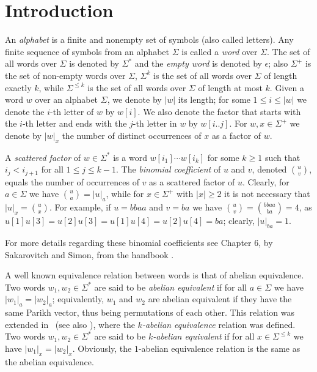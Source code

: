 \documentclass[runningheads]{llncs}
\newcommand{\eps}{\epsilon}
\begin{document}
\section{Introduction}
An {\it alphabet} is a finite and nonempty set of symbols (also called letters). Any finite sequence of symbols from an alphabet $\Sigma$ is called a {\it word} over $\Sigma$. The set of all words over $\Sigma$ is denoted by $\Sigma^*$ and the {\em empty word} is denoted by $\eps$; also $\Sigma^+$ is the set of non-empty words over $\Sigma$, $\Sigma^k$ is the set of all words over $\Sigma$ of length exactly $k$, while $\Sigma^{\le k}$ is the set of all words over $\Sigma$ of length at most $k$. Given a word $w$ over an alphabet $\Sigma $, we denote by $|w|$ its length; for some $1 \leq i \leq |w|$ we denote the $i$-th letter of $w$ by $w[i]$. We also denote the factor that starts with the $i$-th letter and ends with the $j$-th letter in $w$ by $w[i..j]$. For $w,x\in \Sigma^+$ we denote by $|w|_x$ the number of distinct occurrences of $x$ as a factor of $w$. 

A \emph{scattered factor} of $w\in \Sigma^*$ is a word $w[i_1]\cdots w[i_k]$ for some $k\geq 1$ such that $i_j<i_{j+1}$ for all $1\leq j\leq k-1$. The \emph{binomial coefficient} of $u$ and $v$, denoted $u \choose v$, equals the number of occurrences of $v$ as a scattered factor of $u$. Clearly, for $a\in \Sigma$ we have ${u \choose a}=|u|_a$, while for $x\in \Sigma^+$ with $|x|\geq 2$ it is not necessary that $|u|_x={u\choose x}$. 
For example, if $u=bbaa$ and $v=ba$ we have ${u \choose v} ={bbaa\choose ba}=4$, as $u[1]u[3]=u[2]u[3]=u[1]u[4]=u[2]u[4]=ba$; clearly, $|u|_{ba}=1$.

For more details regarding these binomial coefficients see Chapter 6, by Sakarovitch and Simon, from the handbook \cite{Loth97}.

A well known equivalence relation between words is that of abelian equivalence. Two words $w_1,w_2\in \Sigma^*$ are said to be \emph{abelian equivalent} if for all $a\in \Sigma$ we have  $|w_1|_a=|w_2|_a$; equivalently, $w_1$ and $w_2$ are abelian equivalent if they have the same Parikh vector, thus being permutations of each other. This relation was extended in~\cite{KSZ13} (see also \cite{HuKaSaSa11}), where the \emph{$k$-abelian equivalence} relation was defined. Two words $w_1,w_2\in \Sigma^*$ are said to be \emph{$k$-abelian equivalent} if for all $x\in \Sigma^{\leq k}$ we have $|w_1|_x=|w_2|_x$. Obviously, the $1$-abelian equivalence relation is the same as the abelian equivalence.
\end{document}

